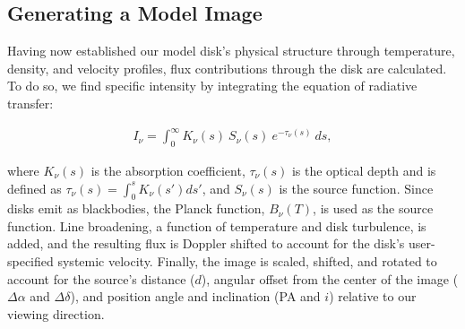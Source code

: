 




\subsection{Generating a Model Image}

Having now established our model disk's physical structure through temperature, density, and velocity profiles, flux contributions through the disk are calculated. To do so, we find specific intensity by integrating the equation of radiative transfer:

\begin{align}
  I_\nu = \int_0^{\infty} K_\nu(s)\ S_\nu(s)\ e^{-\tau_\nu(s)}\ ds,
\end{align}

where $K_\nu(s)$ is the absorption coefficient, $\tau_\nu(s)$ is the optical depth and is defined as $\tau_\nu(s) = \int_0^s K_\nu(s') ds'$, and $S_\nu(s)$ is the source function. Since disks emit as blackbodies, the Planck function, $B_\nu(T)$, is used as the source function. Line broadening, a function of temperature and disk turbulence, is added, and the resulting flux is Doppler shifted to account for the disk's user-specified systemic velocity. Finally, the image is scaled, shifted, and rotated to account for the source's distance ($d$), angular offset from the center of the image ($\Delta \alpha$ and $\Delta \delta$), and position angle and inclination (PA and $i$) relative to our viewing direction.

